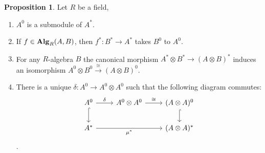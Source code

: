 \documentclass[8pt]{article}
\theoremstyle{definition}
\theoremstyle{definition}
\theoremstyle{definition}
\theoremstyle{definition}
\theoremstyle{definition}
\theoremstyle{definition}
\theoremstyle{definition}
\newtheorem{prop}{Proposition}[section]
\theoremstyle{definition}
\theoremstyle{definition}
\theoremstyle{definition}
\theoremstyle{definition}
\theoremstyle{definition}
\theoremstyle{definition}
\theoremstyle{definition}
\theoremstyle{question}
\begin{document}
\begin{prop} Let $R$ be a field,
  \begin{enumerate}
    \item $A^0$ is a submodule of $A^*$.
    \item If $f \in {\bf Alg}_R(A, B)$, then $f^* : B^* \to A^*$ takes $B^0$ to $A^0$.
    \item For any $R$-algebra $B$ the canonical morphism $A^* \otimes B^* \to (A \otimes B)^*$
    induces an isomorphism $A^0 \otimes B^0 \xrightarrow{\cong} (A \otimes B)^0$.
    \item There is a unique $\delta : A^0 \to A^0 \otimes A^0$ such that the following diagram commutes:
    \[
    \begin{tikzcd}
      A^0 \ar[d, hookrightarrow] \ar[r, "\delta"] & A^0 \otimes A^0 \ar[r, "\cong"] & (A \otimes A)^0 \ar[d, hookrightarrow] \\
      A^* \ar[rr, "\mu^*"'] && (A \otimes A)^*
    \end{tikzcd}
    \].
  \end{enumerate}
\end{prop}
\end{document}
